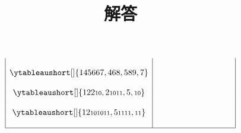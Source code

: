 \documentclass[10pt,fleqn]{article}
\theoremstyle{plain}
\theoremstyle{definition}
\renewcommand{\(}{\left(}
\renewcommand{\)}{\right)}
\renewcommand{\[}{\left[}
\renewcommand{\]}{\right]}
\renewcommand{\{}{\left\lbrace}
\renewcommand{\}}{\right\rbrace}
\begin{document}
\begin{figure}[H]
\begin{align*}
\begin{array}{|c|cccccccccc|}
 &  &  &  &  &  &  &  &  &  &  \\
\ytableaushort[]{145667,468,589,7} &  &  &  &  &  &  &  &  &  &  \\
 &  &  &  &  &  &  &  &  &  &  \\
\ytableaushort[]{122{\scriptstyle 10},2{\scriptstyle 10}{\scriptstyle 11},5,{\scriptstyle 10}} &  &  &  &  &  &  &  &  &  &  \\
 &  &  &  &  &  &  &  &  &  &  \\
\ytableaushort[]{12{\scriptstyle 10}{\scriptstyle 10}{\scriptstyle 11},5{\scriptstyle 11}{\scriptstyle 11},{\scriptstyle 11}} &  &  &  &  &  &  &  &  &  &  \\
 &  &  &  &  &  &  &  &  &  &  \\
            \hline
        \end{array}
    \end{align*}
\end{figure}

\newpage

\title{解答}

\end{document}
